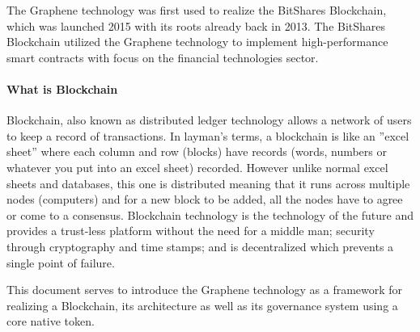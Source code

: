 The Graphene technology was first used to realize the BitShares Blockchain, which was launched 2015 with its
roots already back in 2013. The BitShares Blockchain utilized the Graphene technology to implement 
high-performance smart contracts with focus on the financial technologies sector.

\paragraph{What is Blockchain}
Blockchain, also known as distributed ledger technology allows a network
of users to keep a record of transactions. In layman's terms, a
blockchain is like an ''excel sheet'' where each column and row (blocks)
have records (words, numbers or whatever you put into an excel sheet)
recorded. However unlike normal excel sheets and databases, this one is
distributed meaning that it runs across multiple nodes (computers) and
for a new block to be added, all the nodes have to agree or come to a
consensus. Blockchain technology is the technology of the future and provides a
trust-less platform without the need for a middle man; security through
cryptography and time stamps; and is decentralized which prevents a
single point of failure.

This document serves to introduce the Graphene technology as a framework for realizing a Blockchain, its architecture as well as its governance system using a core native token.
